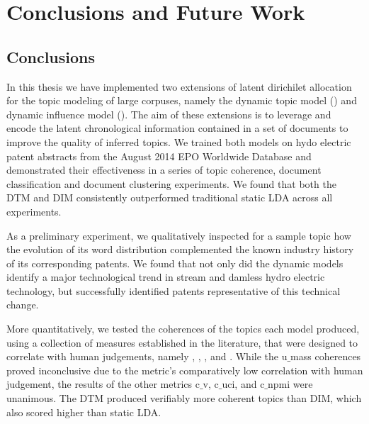
\chapter{Conclusions and Future Work} %

\label{Chapter5} %



\section{Conclusions}

In this thesis we have implemented two extensions of latent dirichilet allocation for the topic modeling of large corpuses, namely the dynamic topic model () and dynamic influence model (). The aim of these extensions is to leverage and encode the latent chronological information contained in a set of documents to improve the quality of inferred topics. We trained both models on hydo electric patent abstracts from the August 2014 EPO Worldwide  Database and demonstrated their effectiveness in a series of topic coherence, document classification and document clustering experiments. We found that both the DTM and DIM consistently outperformed traditional static LDA across all experiments.

As a preliminary experiment, we qualitatively inspected for a sample topic how the evolution of its word distribution complemented the known industry history of its corresponding patents. We found that not only did the dynamic models identify a major technological trend in stream and damless hydro electric technology, but successfully identified patents representative of this technical change. 

More quantitatively, we tested the coherences of the topics each model produced, using a collection of measures established in the literature, that were designed to correlate with human judgements, namely , , , and . While the u$\_$mass coherences proved inconclusive due to the metric's  comparatively low correlation with human judgement, the results of the other metrics c$\_$v, c$\_$uci, and c$\_$npmi were unanimous. The DTM produced verifiably more coherent topics than DIM, which also scored higher than static LDA. 

